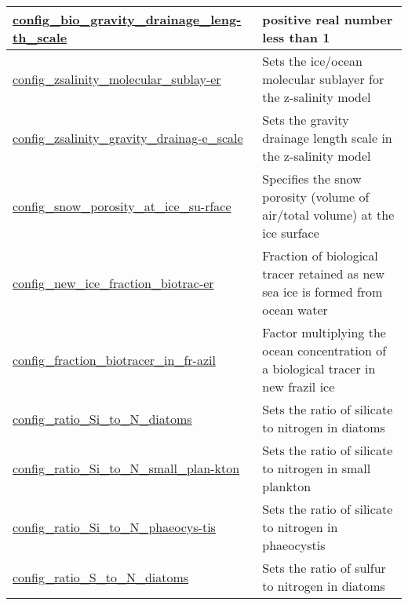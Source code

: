 {\begin{center}
\begin{longtable}{| p{2.0in} || p{4.0in} |}
    \hyperref[subsec:nm_sec_config_bio_gravity_drainage_length_scale]{config\_bio\_gravity\_drainage\_leng-}\hyperref[subsec:nm_sec_config_bio_gravity_drainage_length_scale]{th\_scale}& positive real number less than 1 \\
    \hline
    \hyperref[subsec:nm_sec_config_zsalinity_molecular_sublayer]{config\_zsalinity\_molecular\_sublay-}\hyperref[subsec:nm_sec_config_zsalinity_molecular_sublayer]{er}& Sets the ice/ocean molecular sublayer for the z-salinity model \\
    \hline
    \hyperref[subsec:nm_sec_config_zsalinity_gravity_drainage_scale]{config\_zsalinity\_gravity\_drainag-}\hyperref[subsec:nm_sec_config_zsalinity_gravity_drainage_scale]{e\_scale}& Sets the gravity drainage length scale in the z-salinity model \\
    \hline
    \hyperref[subsec:nm_sec_config_snow_porosity_at_ice_surface]{config\_snow\_porosity\_at\_ice\_su-}\hyperref[subsec:nm_sec_config_snow_porosity_at_ice_surface]{rface}& Specifies the snow porosity (volume of air/total volume) at the ice surface \\
    \hline
    \hyperref[subsec:nm_sec_config_new_ice_fraction_biotracer]{config\_new\_ice\_fraction\_biotrac-}\hyperref[subsec:nm_sec_config_new_ice_fraction_biotracer]{er}& Fraction of biological tracer retained as new sea ice is formed from ocean water \\
    \hline
    \hyperref[subsec:nm_sec_config_fraction_biotracer_in_frazil]{config\_fraction\_biotracer\_in\_fr-}\hyperref[subsec:nm_sec_config_fraction_biotracer_in_frazil]{azil}& Factor multiplying the ocean concentration of a biological tracer in new frazil ice \\
    \hline
    \hyperref[subsec:nm_sec_config_ratio_Si_to_N_diatoms]{config\_ratio\_Si\_to\_N\_diatoms} & Sets the ratio of silicate to nitrogen in diatoms \\
    \hline
    \hyperref[subsec:nm_sec_config_ratio_Si_to_N_small_plankton]{config\_ratio\_Si\_to\_N\_small\_plan-}\hyperref[subsec:nm_sec_config_ratio_Si_to_N_small_plankton]{kton}& Sets the ratio of silicate to nitrogen in small plankton \\
    \hline
    \hyperref[subsec:nm_sec_config_ratio_Si_to_N_phaeocystis]{config\_ratio\_Si\_to\_N\_phaeocys-}\hyperref[subsec:nm_sec_config_ratio_Si_to_N_phaeocystis]{tis}& Sets the ratio of silicate to nitrogen in phaeocystis \\
    \hline
    \hyperref[subsec:nm_sec_config_ratio_S_to_N_diatoms]{config\_ratio\_S\_to\_N\_diatoms} & Sets the ratio of sulfur to nitrogen in diatoms \\

\end{longtable}
\end{center}}
